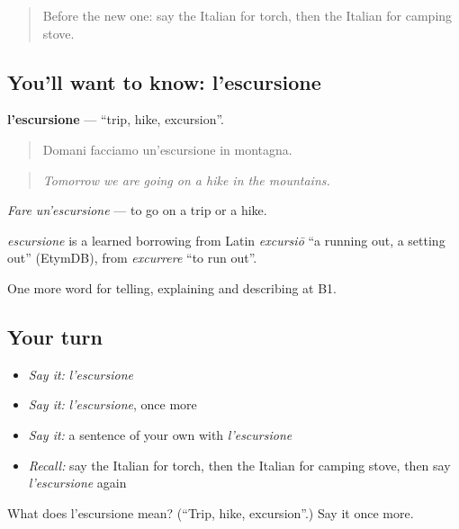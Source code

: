 \begin{quote}
Before the new one: say the Italian for torch, then the Italian for camping stove.
\end{quote}

\subsection*{You'll want to know: l'escursione}
\textbf{l'escursione} — \textquotedblleft{}trip, hike, excursion\textquotedblright{}.

\begin{quote}
Domani facciamo un'escursione in montagna.
\end{quote}

\begin{quote}
\emph{Tomorrow we are going on a hike in the mountains.}
\end{quote}

\emph{Fare un'escursione} — to go on a trip or a hike.

\begin{cousinweb}
\emph{escursione} is a learned borrowing from Latin \emph{excursiō} \textquotedblleft{}a running out, a setting out\textquotedblright{} (EtymDB), from \emph{excurrere} \textquotedblleft{}to run out\textquotedblright{}.
\end{cousinweb}

\begin{grammarlens}[title={What you've built}]
One more word for telling, explaining and describing at B1.
\end{grammarlens}

\subsection*{Your turn}
\begin{itemize}
\raggedright
  \item \emph{Say it:} \emph{l'escursione}
  \item \emph{Say it:} \emph{l'escursione}, once more
  \item \emph{Say it:} a sentence of your own with \emph{l'escursione}
  \item \emph{Recall:} say the Italian for torch, then the Italian for camping stove, then say \emph{l'escursione} again
\end{itemize}

\begin{tcolorbox}[breakable,colback=teal!4,colframe=teal!35!black,title={Before you move on}]
What does l'escursione mean? (\textquotedblleft{}Trip, hike, excursion\textquotedblright{}.) Say it once more.
\end{tcolorbox}
